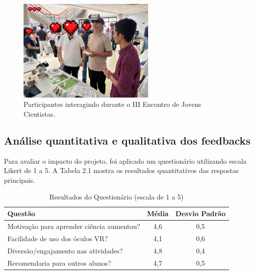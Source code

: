 \begin{figure}[H]
    \centering
    \includegraphics[width=0.6\textwidth]{docs/figuras/Imagem3.png}
    \caption{Participantes interagindo durante o III Encontro de Jovens Cientistas.}
    \label{fig:evento_joes}
\end{figure}

\subsection{Análise quantitativa e qualitativa dos feedbacks}

Para avaliar o impacto do projeto, foi aplicado um questionário utilizando escala Likert de 1 a 5. A Tabela 2.1 mostra os resultados quantitativos das respostas principais.

\begin{table}[!ht]%
  \begin{center}%
  \caption{Resultados do Questionário (escala de 1 a 5)}
    \begin{tabular}{l|c|c}
\hline %
Questão & Média & Desvio Padrão \\
\hline %
Motivação para aprender ciência aumentou? & 4,6 & 0,5 \\
Facilidade de uso dos óculos VR? & 4,1 & 0,6 \\
Diversão/engajamento nas atividades? & 4,8 & 0,4 \\
Recomendaria para outros alunos? & 4,7 & 0,5 \\
\hline %
    \end{tabular}
  \end{center}
\end{table}

